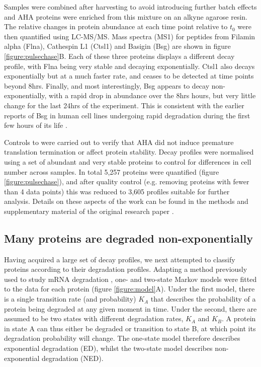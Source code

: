 \documentclass[a4paper,11pt,twoside,openright]{scrbook}
\begin{document}
Samples were combined after harvesting to avoid introducing further batch effects and AHA proteins were enriched from this mixture on an alkyne agarose resin. The relative changes in protein abundance at each time point relative to $t_{0}$ were then quantified using LC-MS/MS. Mass spectra (MS1) for peptides from Filamin  alpha (Flna), Cathespin L1 (Ctsl1) and Basigin (Bsg) are shown in figure \ref{figure:pulsechase}B. Each of these three proteins displays a different decay profile, with Flna being very stable and decaying exponentially. Ctsl1 also decays exponentially but at a much faster rate, and ceases to be detected at time points beyond 8hrs. Finally, and most interestingly, Bsg appears to decay non-exponentially, with a rapid drop in abundance over the 8hrs hours, but very little change for the last 24hrs of the experiment. This is consistent with the earlier reports of Bsg in human cell lines undergoing rapid degradation during the first few hours of its life \cite{Tyler2012}.

Controls to were carried out to verify that AHA did not induce premature translation termination or affect protein stability. Decay profiles were normalised using a set of abundant and very stable proteins to control for differences in cell number across samples. In total 5,257 proteins were quantified (figure \ref{figure:pulsechase}), and after quality control (e.g. removing proteins with fewer than 4 data points) this was reduced to 3,605 profiles suitable for further analysis. Details on these aspects of the work can be found in the methods and supplementary material of the original research paper \cite{McShane2016}.

\subsection{Many proteins are degraded non-exponentially}
Having acquired a large set of decay profiles, we next attempted to classify proteins according to their degradation profiles. Adapting a method previously used to study mRNA degradation \cite{Deneke2013}, one- and two-state Markov models were fitted to the data for each protein (figure \ref{figure:model}A). Under the first model, there is a single transition rate (and probability) $K_{A}$ that describes the probability of a protein being degraded at any given moment in time. Under the second, there are assumed to be two states with different degradation rates, $K_{A}$ and $K_{B}$. A protein in state A can thus either be degraded or transition to state B, at which point its degradation probability will change. The one-state model therefore describes exponential degradation (ED), whilst the two-state model describes non-exponential degradation (NED).
\end{document}
